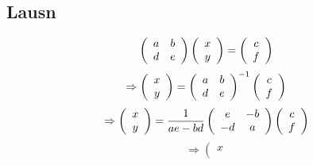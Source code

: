 \subsection{Lausn}
{
    \[
        \left (
        \begin{array}{c c}
            a & b\\
            d & e
        \end{array}
        \right )
        \left (
        \begin{array}{c}
            x\\
            y
        \end{array}
        \right )
        =
        \left (
        \begin{array}{c}
            c\\
            f
        \end{array}
        \right )
    \]
    \pause 
    \[
        \Rightarrow
        \left (
        \begin{array}{c}
            x\\
            y
        \end{array}
        \right )
        =
        \left (
        \begin{array}{c c}
            a & b\\
            d & e
        \end{array}
        \right )^{-1}
        \left (
        \begin{array}{c}
            c\\
            f
        \end{array}
        \right )
    \]
    \pause 
    \[
        \Rightarrow
        \left (
        \begin{array}{c}
            x\\
            y
        \end{array}
        \right )
        =
        \frac{1}{ae - bd}
        \left (
        \begin{array}{c c}
            e & -b\\
            -d & a
        \end{array}
        \right )
        \left (
        \begin{array}{c}
            c\\
            f
        \end{array}
        \right )
    \]
    \pause 
    \[
        \Rightarrow
        \left (
        \begin{array}{c}
            x\\

\end{array}\]}
